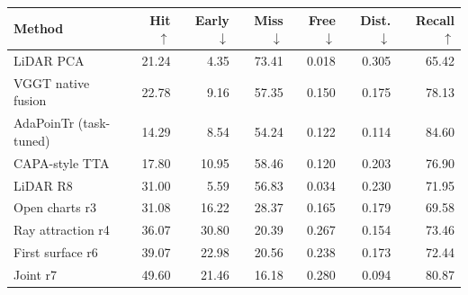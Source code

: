 \begin{tabular}{lrrrrrr}
\toprule
Method & Hit $\uparrow$ & Early $\downarrow$ & Miss $\downarrow$ & Free $\downarrow$ & Dist. $\downarrow$ & Recall $\uparrow$ \\
\midrule
LiDAR PCA & 21.24 & 4.35 & 73.41 & 0.018 & 0.305 & 65.42 \\
VGGT native fusion & 22.78 & 9.16 & 57.35 & 0.150 & 0.175 & 78.13 \\
AdaPoinTr (task-tuned) & 14.29 & 8.54 & 54.24 & 0.122 & 0.114 & 84.60 \\
CAPA-style TTA & 17.80 & 10.95 & 58.46 & 0.120 & 0.203 & 76.90 \\
LiDAR R8 & 31.00 & 5.59 & 56.83 & 0.034 & 0.230 & 71.95 \\
Open charts r3 & 31.08 & 16.22 & 28.37 & 0.165 & 0.179 & 69.58 \\
Ray attraction r4 & 36.07 & 30.80 & 20.39 & 0.267 & 0.154 & 73.46 \\
First surface r6 & 39.07 & 22.98 & 20.56 & 0.238 & 0.173 & 72.44 \\
Joint r7 & 49.60 & 21.46 & 16.18 & 0.280 & 0.094 & 80.87 \\
\bottomrule
\end{tabular}
